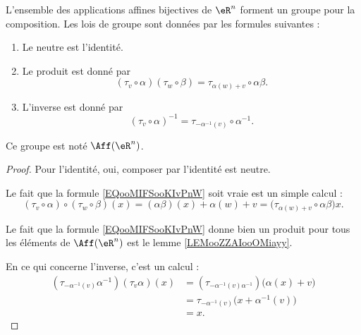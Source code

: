 \begin{propositionDef}      \label{PROPooBPKKooJRAMeT} \label{LEMooUBGZooBIlmAN}
	L'ensemble des applications affines bijectives de \( \eR^n\) forment un groupe pour la composition. Les lois de groupe sont données par les formules suivantes :
	\begin{enumerate}
		\item
		      Le neutre est l'identité.
		\item       \label{ITEMooGUFRooMuhXds}
		      Le produit est donné par
		      \begin{equation}        \label{EQooMIFSooKIvPnW}
			      (\tau_v\circ \alpha)(\tau_w\circ \beta)=\tau_{\alpha(w)+v}\circ \alpha\beta.
		      \end{equation}
		\item       \label{ITEMooYOMSooRUDSdm}
		      L'inverse est donné par
		      \begin{equation}
			      (\tau_v\circ\alpha)^{-1}=\tau_{-\alpha^{-1}(v)}\circ \alpha^{-1}.
		      \end{equation}
	\end{enumerate}
	Ce groupe est noté \( \Aff(\eR^n)\).
\end{propositionDef}

\begin{proof}
	Pour l'identité, oui, composer par l'identité est neutre.

	Le fait que la formule \eqref{EQooMIFSooKIvPnW} soit vraie est un simple calcul :
	\begin{equation}
		(\tau_v\circ\alpha)\circ(\tau_w\circ\beta)(x)=(\alpha\beta)(x)+\alpha(w)+v=\big( \tau_{\alpha(w)+v}\circ \alpha\beta\big)x.
	\end{equation}

	Le fait que la formule \eqref{EQooMIFSooKIvPnW} donne bien un produit pour tous les éléments de \( \Aff(\eR^n)\) est le lemme \ref{LEMooZZAIooOMiayy}.

	En ce qui concerne l'inverse, c'est un calcul :
	\begin{subequations}
		\begin{align}
			(\tau_{-\alpha^{-1}(v)}\alpha^{-1})(\tau_v\alpha)(x) & =(\tau_{-\alpha^{-1}(v)\alpha^{-1}})\big( \alpha(x)+v \big) \\
			                                                     & =\tau_{-\alpha^{-1}(v)}\big( x+\alpha^{-1}(v) \big)         \\
			                                                     & =x.
		\end{align}
	\end{subequations}
\end{proof}

